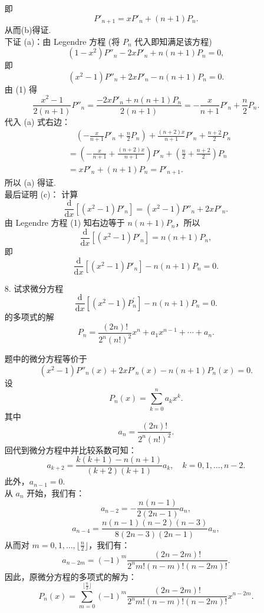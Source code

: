 \begin{enumerate}
\begin{solution}
\[        \]
        即
        \[
        P'_{n+1} = x P'_n + (n+1) P_n.
        \]
        从而(b)得证.\\
        下证 (a)：由 Legendre 方程 (将 $P_{n}$ 代入即知满足该方程)
        \[
        (1-x^2)P''_n - 2xP'_n + n(n+1)P_n = 0,
        \]
        即
        \[
        (x^2-1)P''_n + 2xP'_n - n(n+1)P_n = 0. \tag{1}
        \]
        由 (1) 得
        \[
        \frac{x^2-1}{2(n+1)} P''_n = \frac{-2xP'_n + n(n+1)P_n}{2(n+1)} = -\frac{x}{n+1} P'_n + \frac{n}{2} P_n.
        \]
        代入 (a) 式右边：
        \[
        \begin{aligned}
        &\quad \left( -\frac{x}{n+1} P'_n + \frac{n}{2} P_n \right) + \frac{(n+2)x}{n+1} P'_n + \frac{n+2}{2} P_n \\
        &= \left( -\frac{x}{n+1} + \frac{(n+2)x}{n+1} \right) P'_n + \left( \frac{n}{2} + \frac{n+2}{2} \right) P_n \\
        &= x P'_n + (n+1) P_n=P'_{n+1}.
        \end{aligned}
        \]
        所以 (a) 得证.\\
        最后证明 (c)：
        计算
        \[
        \frac{\mathrm{d}}{\mathrm{d}x} \left[ (x^2 - 1) P'_n \right] = (x^2-1) P''_n + 2x P'_n.
        \]
        由 Legendre 方程 (1) 知右边等于 $n(n+1)P_n$，所以
        \[
        \frac{\mathrm{d}}{\mathrm{d}x} \left[ (x^2 - 1) P'_n \right] = n(n+1) P_n,
        \]
        即
        \[
        \frac{\mathrm{d}}{\mathrm{d}x} \left[ (x^2 - 1) P'_n \right] - n(n+1) P_n = 0.
        \]
    \end{solution}

    \item[8.]试求微分方程
    \[
        \displaystyle \frac{\mathrm{d}}{\mathrm{d}x}\left[ (x^2-1)P^{\prime}_n \right] - n(n+1)P_n =0.
    \]
    的多项式的解
    \[
        \displaystyle P_n=\frac{(2n)!}{2^n(n!)^2}x^n+a_1x^{n-1}+\cdots+a_n.
    \]
    \begin{solution}
        题中的微分方程等价于
        \[
        (x^2 - 1) P''_n(x) + 2x P'_n(x) - n(n+1) P_n(x) = 0.
        \]
        设
        \[
        P_n(x) = \sum_{k=0}^n a_k x^k.
        \]
        其中
        \[
        a_n = \frac{(2n)!}{2^n (n!)^2}.
        \]
        回代到微分方程中并比较系数可知：
        \[
        a_{k+2} = \frac{k(k+1) - n(n+1)}{(k+2)(k+1)} a_k, \quad k=0,1,\ldots,n-2.
        \]
        此外，$a_{n-1} = 0$.\\
        从 $a_n$ 开始，我们有：
        \[
        a_{n-2} = -\frac{n(n-1)}{2(2n-1)} a_n,
        \]
        \[
        a_{n-4} = \frac{n(n-1)(n-2)(n-3)}{8(2n-3)(2n-1)} a_n,
        \]
        从而对 $\displaystyle m=0,1,\ldots,\lfloor \frac{n}{2} \rfloor$，我们有：
        \[
        a_{n-2m} = (-1)^m \frac{(2n-2m)!}{2^n m! (n-m)! (n-2m)!}.
        \]
        因此，原微分方程的多项式的解为：
        \[
        P_n(x) = \sum_{m=0}^{\lfloor \frac{n}{2} \rfloor} (-1)^m \frac{(2n-2m)!}{2^n m! (n-m)! (n-2m)!} x^{n-2m}.
        \]
    \end{solution}


\end{enumerate}
